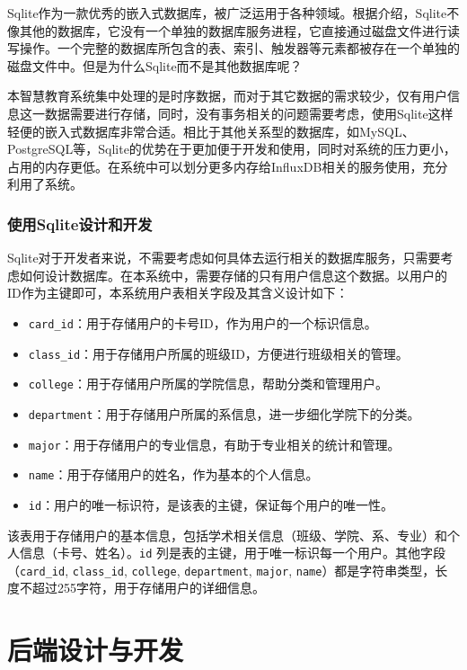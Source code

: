\documentclass[oneside]{xduugthesis}
\begin{document}
Sqlite作为一款优秀的嵌入式数据库，被广泛运用于各种领域。根据\cite{SQLite官方文档}介绍，Sqlite不像其他的数据库，它没有一个单独的数据库服务进程，它直接通过磁盘文件进行读写操作。一个完整的数据库所包含的表、索引、触发器等元素都被存在一个单独的磁盘文件中。但是为什么Sqlite而不是其他数据库呢？

本智慧教育系统集中处理的是时序数据，而对于其它数据的需求较少，仅有用户信息这一数据需要进行存储，同时，没有事务相关的问题需要考虑，使用Sqlite这样轻便的嵌入式数据库非常合适。相比于其他关系型的数据库，如MySQL、PostgreSQL等，Sqlite的优势在于更加便于开发和使用，同时对系统的压力更小，占用的内存更低。在系统中可以划分更多内存给InfluxDB相关的服务使用，充分利用了系统。

\subsubsection{使用Sqlite设计和开发}

Sqlite对于开发者来说，不需要考虑如何具体去运行相关的数据库服务，只需要考虑如何设计数据库。在本系统中，需要存储的只有用户信息这个数据。以用户的ID作为主键即可，本系统用户表相关字段及其含义设计如下：

\begin{itemize}[nosep]
    \item \texttt{card\_id}：用于存储用户的卡号ID，作为用户的一个标识信息。
    \item \texttt{class\_id}：用于存储用户所属的班级ID，方便进行班级相关的管理。
    \item \texttt{college}：用于存储用户所属的学院信息，帮助分类和管理用户。
    \item \texttt{department}：用于存储用户所属的系信息，进一步细化学院下的分类。
    \item \texttt{major}：用于存储用户的专业信息，有助于专业相关的统计和管理。
    \item \texttt{name}：用于存储用户的姓名，作为基本的个人信息。
    \item \texttt{id}：用户的唯一标识符，是该表的主键，保证每个用户的唯一性。
\end{itemize}

该表用于存储用户的基本信息，包括学术相关信息（班级、学院、系、专业）和个人信息（卡号、姓名）。\texttt{id} 列是表的主键，用于唯一标识每一个用户。其他字段（\texttt{card\_id}, \texttt{class\_id}, \texttt{college}, \texttt{department}, \texttt{major}, \texttt{name}）都是字符串类型，长度不超过255字符，用于存储用户的详细信息。

\section{后端设计与开发}
\end{document}
